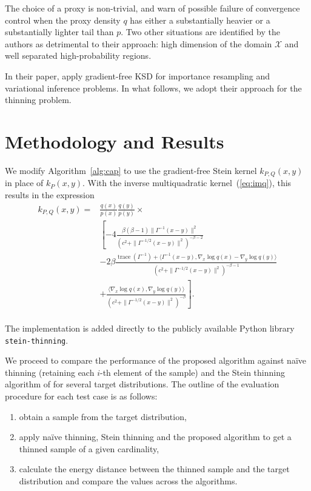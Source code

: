 \documentclass[11pt,a4paper]{report}
\DeclareMathOperator{\trace}{trace}
\begin{document}
The choice of a proxy is non-trivial, and \cite{fisherGradientFreeKernelStein2024} warn of possible failure of convergence control when the proxy density $q$ has either a substantially heavier or a substantially lighter tail than $p$. Two other situations are identified by the authors as detrimental to their approach: high dimension of the domain $\mathcal{X}$ and well separated high-probability regions.

In their paper, \cite{fisherGradientFreeKernelStein2024} apply gradient-free KSD for importance resampling and variational inference problems. In what follows, we adopt their approach for the thinning problem.

\chapter{Methodology and Results}
\label{ch:methodology}

We modify Algorithm~\ref{alg:cap} to use the gradient-free Stein kernel $k_{P,Q}(x,y)$ in place of $k_P(x, y)$. With the inverse multiquadratic kernel~(\ref{eq:imq}), this results in the expression
\begin{equation*}
\begin{aligned}
k_{P,Q}(x, y)
= &\frac{q(x)}{p(x)} \frac{q(y)}{p(y)} \times \\
 &\left[ -4 \frac{\beta(\beta-1) \| \Gamma^{-1}(x - y)\|^2}{(c^2 + \| \Gamma^{-1/2}(x-y)\|^2)^{-\beta-2}} \right.  \\
&- 2 \beta \frac{\trace(\Gamma^{-1}) + \langle \Gamma^{-1} (x - y), \nabla_x \log q(x) - \nabla_y \log q(y)\rangle}{(c^2 + \| \Gamma^{-1/2}(x-y)\|^2)^{-\beta-1}} \\
& \left. + \frac{\langle \nabla_x \log q(x), \nabla_y \log q(y) \rangle}{(c^2 + \| \Gamma^{-1/2}(x-y)\|^2)^{-\beta}} \right]. \\
\end{aligned}
\label{eq:k_Q}
\end{equation*}

The implementation is added directly to the publicly available Python library \texttt{stein-thinning}.

We proceed to compare the performance of the proposed algorithm against na\"ive thinning (retaining each $i$-th element of the sample) and the Stein thinning algorithm of \cite{riabizOptimalThinningMCMC2022} for several target distributions. The outline of the evaluation procedure for each test case is as follows:
\begin{enumerate}
\item obtain a sample from the target distribution,
\item apply na\"ive thinning, Stein thinning and the proposed algorithm to get a thinned sample of a given cardinality,
\item calculate the energy distance between the thinned sample and the target distribution and compare the values across the algorithms.
\end{enumerate}
\end{document}
